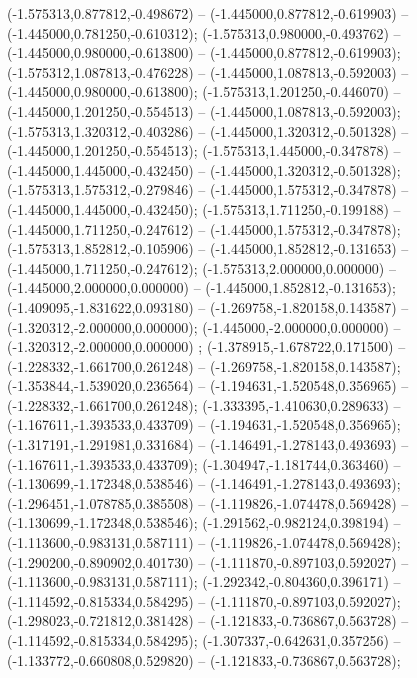  (-1.575313,0.877812,-0.498672) -- (-1.445000,0.877812,-0.619903) -- (-1.445000,0.781250,-0.610312);
 (-1.575313,0.980000,-0.493762) -- (-1.445000,0.980000,-0.613800) -- (-1.445000,0.877812,-0.619903);
 (-1.575312,1.087813,-0.476228) -- (-1.445000,1.087813,-0.592003) -- (-1.445000,0.980000,-0.613800);
 (-1.575313,1.201250,-0.446070) -- (-1.445000,1.201250,-0.554513) -- (-1.445000,1.087813,-0.592003);
 (-1.575313,1.320312,-0.403286) -- (-1.445000,1.320312,-0.501328) -- (-1.445000,1.201250,-0.554513);
 (-1.575313,1.445000,-0.347878) -- (-1.445000,1.445000,-0.432450) -- (-1.445000,1.320312,-0.501328);
 (-1.575313,1.575312,-0.279846) -- (-1.445000,1.575312,-0.347878) -- (-1.445000,1.445000,-0.432450);
 (-1.575313,1.711250,-0.199188) -- (-1.445000,1.711250,-0.247612) -- (-1.445000,1.575312,-0.347878);
 (-1.575313,1.852812,-0.105906) -- (-1.445000,1.852812,-0.131653) -- (-1.445000,1.711250,-0.247612);
 (-1.575313,2.000000,0.000000) -- (-1.445000,2.000000,0.000000) -- (-1.445000,1.852812,-0.131653);
 (-1.409095,-1.831622,0.093180) -- (-1.269758,-1.820158,0.143587) -- (-1.320312,-2.000000,0.000000);
 (-1.445000,-2.000000,0.000000) -- (-1.320312,-2.000000,0.000000) ;
 (-1.378915,-1.678722,0.171500) -- (-1.228332,-1.661700,0.261248) -- (-1.269758,-1.820158,0.143587);
 (-1.353844,-1.539020,0.236564) -- (-1.194631,-1.520548,0.356965) -- (-1.228332,-1.661700,0.261248);
 (-1.333395,-1.410630,0.289633) -- (-1.167611,-1.393533,0.433709) -- (-1.194631,-1.520548,0.356965);
 (-1.317191,-1.291981,0.331684) -- (-1.146491,-1.278143,0.493693) -- (-1.167611,-1.393533,0.433709);
 (-1.304947,-1.181744,0.363460) -- (-1.130699,-1.172348,0.538546) -- (-1.146491,-1.278143,0.493693);
 (-1.296451,-1.078785,0.385508) -- (-1.119826,-1.074478,0.569428) -- (-1.130699,-1.172348,0.538546);
 (-1.291562,-0.982124,0.398194) -- (-1.113600,-0.983131,0.587111) -- (-1.119826,-1.074478,0.569428);
 (-1.290200,-0.890902,0.401730) -- (-1.111870,-0.897103,0.592027) -- (-1.113600,-0.983131,0.587111);
 (-1.292342,-0.804360,0.396171) -- (-1.114592,-0.815334,0.584295) -- (-1.111870,-0.897103,0.592027);
 (-1.298023,-0.721812,0.381428) -- (-1.121833,-0.736867,0.563728) -- (-1.114592,-0.815334,0.584295);
 (-1.307337,-0.642631,0.357256) -- (-1.133772,-0.660808,0.529820) -- (-1.121833,-0.736867,0.563728);
